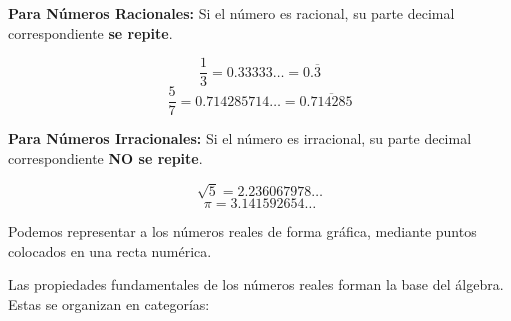 
\textbf{Para Números Racionales:} Si el número es racional, su parte decimal correspondiente \textbf{se repite}.

\begin{example}
$$\frac{1}{3} = 0.33333\ldots = 0.\overline{3}$$
$$\frac{5}{7} = 0.714285714\ldots = 0.\overline{714285}$$
\end{example}

\textbf{Para Números Irracionales:} Si el número es irracional, su parte decimal correspondiente \textbf{NO se repite}.

\begin{example}
$$\sqrt{5} = 2.236067978\ldots$$
$$\pi = 3.141592654\ldots$$
\end{example}


Podemos representar a los números reales de forma gráfica, mediante puntos colocados en una recta numérica.

\begin{center}
\end{center}


Las propiedades fundamentales de los números reales forman la base del álgebra. Estas se organizan en categorías:

